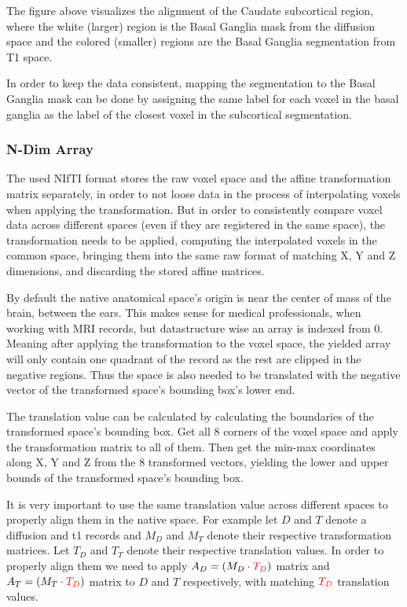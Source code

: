 The figure above visualizes the alignment of the Caudate subcortical region, where the white (larger) region is the Basal Ganglia mask from the diffusion space and the colored (smaller) regions are the Basal Ganglia segmentation from T1 space.\par

In order to keep the data consistent, mapping the segmentation to the Basal Ganglia mask can be done by assigning the same label for each voxel in the basal ganglia as the label of the closest voxel in the subcortical segmentation.

\subsubsection{N-Dim Array}
The used \ac{NIfTI} format stores the raw voxel space and the affine transformation matrix separately, in order to not loose data in the process of interpolating voxels when applying the transformation. But in order to consistently compare voxel data across different spaces (even if they are registered in the same space), the transformation needs to be applied, computing the interpolated voxels in the common space, bringing them into the same raw format of matching X, Y and Z dimensions, and discarding the stored affine matrices.\par

By default the native anatomical space's origin is near the center of mass of the brain, between the ears. This makes sense for medical professionals, when working with \ac{MRI} records, but datastructure wise an array is indexed from 0. Meaning after applying the transformation to the voxel space, the yielded array will only contain one quadrant of the record as the rest are clipped in the negative regions. Thus the space is also needed to be translated with the negative vector of the transformed space's bounding box's lower end.\par

The translation value can be calculated by calculating the boundaries of the transformed space's bounding box. Get all 8 corners of the voxel space and apply the transformation matrix to all of them. Then get the min-max coordinates along X, Y and Z from the 8 transformed vectors, yielding the lower and upper bounds of the transformed space's bounding box.\par

It is very important to use the same translation value across different spaces to properly align them in the native space. For example let $D$ and $T$ denote a diffusion and t1 records and $M_D$ and $M_T$ denote their respective transformation matrices. Let $T_D$ and $T_T$ denote their respective translation values. In order to properly align them we need to apply $A_D = (M_D \cdot {\color{red}T_D})$ matrix and $A_T = (M_T \cdot {\color{red}T_D})$ matrix to $D$ and $T$ respectively, with matching ${\color{red}T_D}$ translation values.\par

